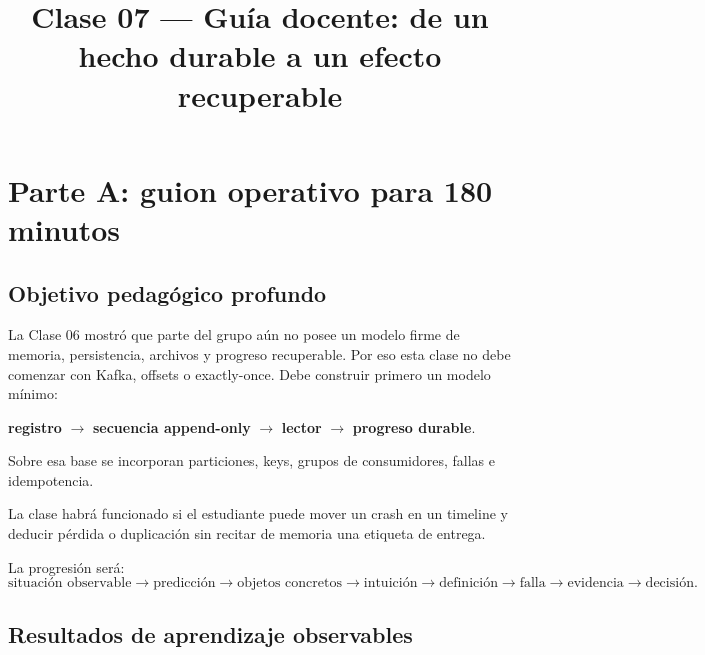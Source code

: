 \documentclass[variant=docente,cover=institutional,mode=screen]{ua-engineering-v6-article}
\title{Clase 07 --- Guía docente: de un hecho durable a un efecto recuperable}
\author{\UAProfessor}
\date{\UADate}
\begin{document}
\maketitle
\tableofcontents
\clearpage

\section{Parte A: guion operativo para 180 minutos}

\subsection{Objetivo pedagógico profundo}

La Clase 06 mostró que parte del grupo aún no posee un modelo firme de memoria, persistencia, archivos y progreso recuperable. Por eso esta clase no debe comenzar con Kafka, offsets o exactly-once. Debe construir primero un modelo mínimo:

\begin{center}
\textbf{registro} $\rightarrow$ \textbf{secuencia append-only} $\rightarrow$ \textbf{lector} $\rightarrow$ \textbf{progreso durable}.
\end{center}

Sobre esa base se incorporan particiones, keys, grupos de consumidores, fallas e idempotencia.

\begin{uakeybox}
La clase habrá funcionado si el estudiante puede mover un crash en un timeline y deducir pérdida o duplicación sin recitar de memoria una etiqueta de entrega.
\end{uakeybox}

La progresión será:
\[
\text{situación observable}
\rightarrow
\text{predicción}
\rightarrow
\text{objetos concretos}
\rightarrow
\text{intuición}
\rightarrow
\text{definición}
\rightarrow
\text{falla}
\rightarrow
\text{evidencia}
\rightarrow
\text{decisión}.
\]

\subsection{Resultados de aprendizaje observables}
\end{document}
